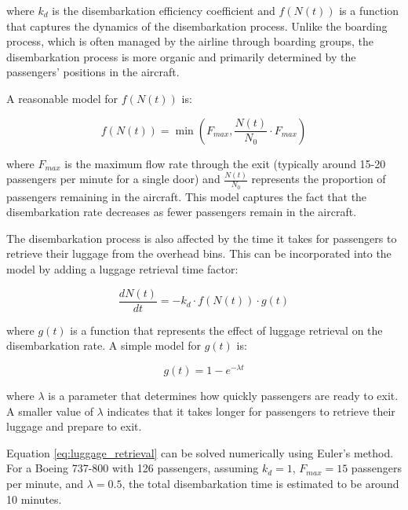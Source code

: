 \documentclass[12pt,a4paper]{article}
\begin{document}
where $k_d$ is the disembarkation efficiency coefficient and $f(N(t))$ is a function that captures the dynamics of the disembarkation process. Unlike the boarding process, which is often managed by the airline through boarding groups, the disembarkation process is more organic and primarily determined by the passengers' positions in the aircraft.

A reasonable model for $f(N(t))$ is:

\begin{equation}
f(N(t)) = \min\left(F_{max}, \frac{N(t)}{N_0} \cdot F_{max}\right)
\label{eq:disembarkation_rate}
\end{equation}

where $F_{max}$ is the maximum flow rate through the exit (typically around 15-20 passengers per minute for a single door) and $\frac{N(t)}{N_0}$ represents the proportion of passengers remaining in the aircraft. This model captures the fact that the disembarkation rate decreases as fewer passengers remain in the aircraft.

The disembarkation process is also affected by the time it takes for passengers to retrieve their luggage from the overhead bins. This can be incorporated into the model by adding a luggage retrieval time factor:

\begin{equation}
\frac{dN(t)}{dt} = -k_d \cdot f(N(t)) \cdot g(t)
\label{eq:luggage_retrieval}
\end{equation}

where $g(t)$ is a function that represents the effect of luggage retrieval on the disembarkation rate. A simple model for $g(t)$ is:

\begin{equation}
g(t) = 1 - e^{-\lambda t}
\label{eq:retrieval_factor}
\end{equation}

where $\lambda$ is a parameter that determines how quickly passengers are ready to exit. A smaller value of $\lambda$ indicates that it takes longer for passengers to retrieve their luggage and prepare to exit.

Equation \ref{eq:luggage_retrieval} can be solved numerically using Euler's method. For a Boeing 737-800 with 126 passengers, assuming $k_d = 1$, $F_{max} = 15$ passengers per minute, and $\lambda = 0.5$, the total disembarkation time is estimated to be around 10 minutes.
\end{document}

